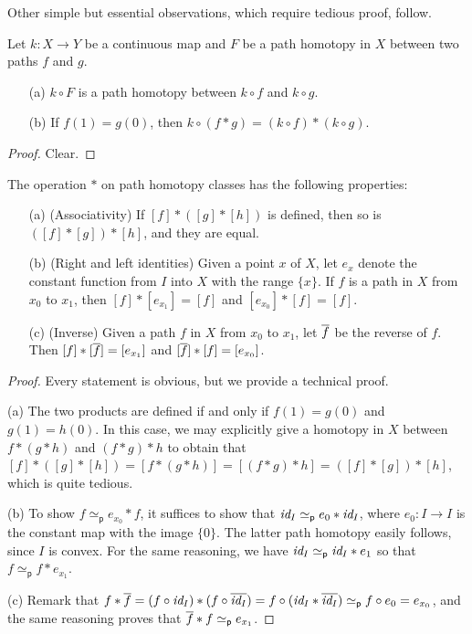 Other simple but essential observations, which require tedious proof, follow.
\begin{obs}
    Let $k: X\rightarrow Y$ be a continuous map and $F$ be a path homotopy in $X$ between two paths $f$ and $g$.
    \begin{enumerate}
        \item[(a)]
        {
            $k\circ F$ is a path homotopy between $k\circ f$ and $k\circ g$.
        }
        \item[(b)]
        {
            If $f(1)=g(0)$, then $k\circ(f*g)=(k\circ f)*(k\circ g)$.
        }
    \end{enumerate}
\end{obs}
\begin{proof}
    Clear.
\end{proof}
\begin{obs}
    The operation $*$ on path homotopy classes has the following properties:
    \begin{enumerate}
        \item[(a)]
        {
            (Associativity)
            If $[f]*([g]*[h])$ is defined, then so is $([f]*[g])*[h]$, and they are equal.
        }
        \item[(b)]
        {
            (Right and left identities)
            Given a point $x$ of $X$, let $e_x$ denote the constant function from $I$ into $X$ with the range $\{x\}$.
            If $f$ is a path in $X$ from $x_0$ to $x_1$, then $[f]*[e_{x_1}]=[f]$ and $[e_{x_0}]*[f]=[f]$.
        }
        \item[(c)]
        {
            (Inverse)
            Given a path $f$ in $X$ from $x_0$ to $x_1$, let $\overline{f}$ be the reverse of $f$.
            Then $[f]*[\overline{f}]=[e_{x_1}]$ and $[\overline{f}]*[f]=[e_{x_0}]$.
        }
    \end{enumerate}
\end{obs}
\begin{proof}
    Every statement is obvious, but we provide a technical proof.

    \hangindent=0.65cm
    \noindent(a)
    The two products are defined if and only if $f(1)=g(0)$ and $g(1)=h(0)$.
    In this case, we may explicitly give a homotopy in $X$ between $f*(g*h)$ and $(f*g)*h$ to obtain that $[f]*([g]*[h])=[f*(g*h)]=[(f*g)*h]=([f]*[g])*[h]$, which is quite tedious.

    \noindent(b)
    To show $f\simeq_\textsf{p} e_{x_0}*f$, it suffices to show that $\textit{id}_{I}\simeq_\textsf{p}e_0*\textit{id}_{I}$, where $e_0: I\rightarrow I$ is the constant map with the image $\{0\}$.
    The latter path homotopy easily follows, since $I$ is convex.
    For the same reasoning, we have $\textit{id}_{I}\simeq_\textsf{p} \textit{id}_{I}*e_1$ so that $f\simeq_\textsf{p} f*e_{x_1}$.

    \noindent(c)
    Remark that $f*\overline{f}=(f\circ\textit{id}_{I})*(f\circ\overline{\textit{id}_{I}})=f\circ(\textit{id}_{I}*\overline{\textit{id}_{I}})\simeq_\textsf{p} f\circ e_0=e_{x_0}$, and the same reasoning proves that $\overline{f}*f \simeq_\textsf{p} e_{x_1}$.
\end{proof}
